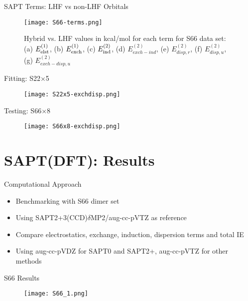 \documentclass{beamer}
\begin{document}
    \begin{frame}{SAPT Terms: LHF vs non-LHF Orbitals}
        \begin{figure}
        \centering
        \texttt{[image: S66-terms.png]}
        \caption{Hybrid vs. LHF values in kcal/mol for each term for S66 data set: (a) $E_{\rm{elst}}^{(1)}$, (b) $E_{\rm{exch}}^{(1)}$, (c) $E_{\rm{ind}}^{(2)}$, (d) $E_{exch-ind}^{(2)}$, (e) $E_{disp,r}^{(2)}$, (f) $E_{disp,u}^{(2)}$, (g) $E_{exch-disp,u}^{(2)}$} 
        \end{figure}        
    \end{frame}

    \begin{frame}{Fitting: S22$\times$5}
        \begin{figure}
            \centering
            \texttt{[image: S22x5-exchdisp.png]}
        \end{figure}   
    \end{frame}

    \begin{frame}{Testing: S66$\times$8}
        \begin{figure}
            \centering
            \texttt{[image: S66x8-exchdisp.png]}
        \end{figure}   
    \end{frame}

\section{SAPT(DFT): Results}

    \begin{frame}{Computational Approach}
        \begin{itemize}
            \item Benchmarking with S66 dimer set
            \item Using SAPT2+3(CCD)$\delta$MP2/aug-cc-pVTZ as reference
            \item Compare electrostatics, exchange, induction, dispersion terms and total IE
            \item Using aug-cc-pVDZ for SAPT0 and SAPT2+, aug-cc-pVTZ for other methods 
        \end{itemize}
    \end{frame}

    \begin{frame}{S66 Results}
        \begin{figure}
            \centering
            \texttt{[image: S66\_1.png]}
        \end{figure}
    \end{frame}
\end{document}
